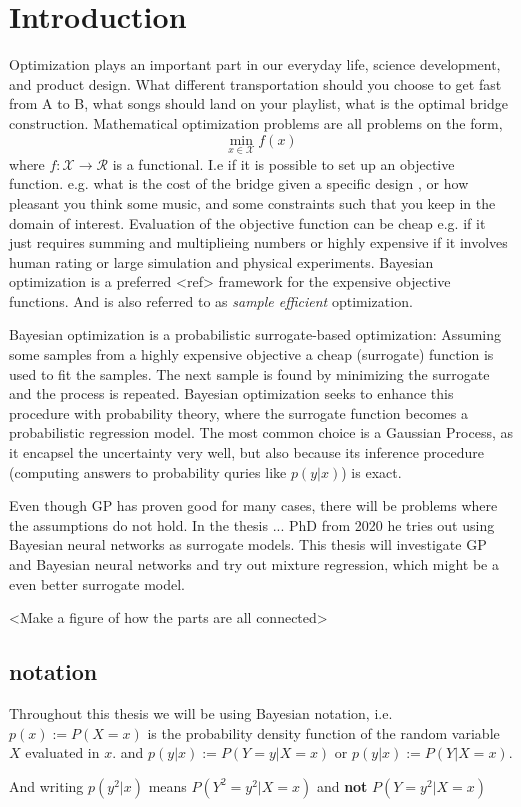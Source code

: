 \chapter{Introduction}

Optimization plays an important part in our everyday life, science development, and product design.
What different transportation should you choose to get fast from A to B, what songs should
land on your playlist, what is the optimal bridge construction. Mathematical optimization problems 
are all problems on the form, 
$$\min_{x\in \mathcal{X}} f(x)$$
where $f: \mathcal{X} \rightarrow \mathcal{R}$ is a functional. I.e if it is possible to set up
an objective function. e.g. what is the cost of the bridge given a specific design
, or how pleasant you think some music, and some constraints such that you keep in the domain of
interest. Evaluation of the objective function can be cheap e.g. if it just requires summing and 
multiplieing numbers or highly expensive if it involves human rating or large simulation and physical 
experiments. Bayesian optimization is a preferred <ref> framework for the expensive objective functions. 
And is also referred to as \textit{sample efficient} optimization. 

Bayesian optimization is a probabilistic surrogate-based optimization: Assuming some samples from a
highly expensive objective a cheap (surrogate) function is used to fit the samples. The next sample
is found by minimizing the surrogate and the process is repeated. Bayesian optimization seeks to
enhance this procedure with probability theory, where the surrogate function becomes a probabilistic
regression model. The most common choice is a Gaussian Process, as it encapsel the uncertainty very well,
but also because its inference procedure (computing answers to probability quries like $p(y|x)$) is exact.

Even though GP has proven good for many cases, there will be problems where the assumptions do not hold. 
In the thesis ... PhD from 2020 he tries out using Bayesian neural networks as surrogate models. 
This thesis will investigate GP and Bayesian neural networks and try out mixture regression, 
which might be a even better surrogate model. 

<Make a figure of how the parts are all connected>

\section{notation}
Throughout this thesis we will be using Bayesian notation, i.e. $p(x) := P(X=x)$ is 
the probability density function of the random variable $X$ evaluated in $x$. 
and $p(y|x) := P(Y=y|X=x)$ or $p(y|x) := P(Y|X=x)$.

And writing $p(y^2|x)$ means $P(Y^2=y^2|X=x)$ and \textbf{not} $P(Y=y^2|X=x)$
